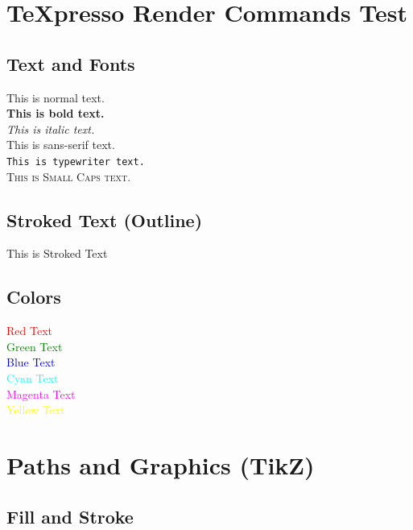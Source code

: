 \documentclass{article}
\begin{document}
\section*{TeXpresso Render Commands Test}

\subsection*{Text and Fonts}
This is normal text. \\
\textbf{This is bold text.} \\
\textit{This is italic text.} \\
\textsf{This is sans-serif text.} \\
\texttt{This is typewriter text.} \\
\textsc{This is Small Caps text.}

\subsection*{Stroked Text (Outline)}
This is Stroked Text

\subsection*{Colors}
\textcolor{red}{Red Text} \\
\textcolor{green}{Green Text} \\
\textcolor{blue}{Blue Text} \\
\textcolor{cyan}{Cyan Text} \\
\textcolor{magenta}{Magenta Text} \\
\textcolor{yellow}{Yellow Text}

\newpage

\section*{Paths and Graphics (TikZ)}

\subsection*{Fill and Stroke}
\hfill
{}
\hfill
{}
\end{document}
